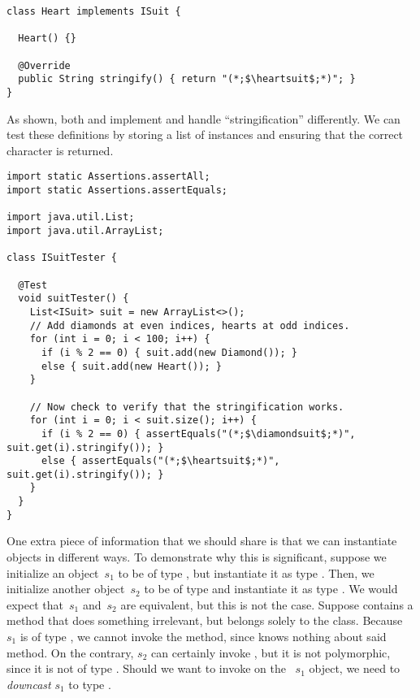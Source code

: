 \begin{lstlisting}[language=MyJava]
class Heart implements ISuit {
    
  Heart() {}

  @Override
  public String stringify() { return "(*;$\heartsuit$;*)"; }
}
\end{lstlisting}

As shown, both  and  implement  and handle ``stringification'' differently. We can test these definitions by storing a list of  instances and ensuring that the correct character is returned.

\begin{lstlisting}[language=MyJava]
import static Assertions.assertAll;
import static Assertions.assertEquals;

import java.util.List;
import java.util.ArrayList;

class ISuitTester {

  @Test
  void suitTester() {
    List<ISuit> suit = new ArrayList<>();
    // Add diamonds at even indices, hearts at odd indices.
    for (int i = 0; i < 100; i++) {
      if (i % 2 == 0) { suit.add(new Diamond()); }
      else { suit.add(new Heart()); }
    }

    // Now check to verify that the stringification works.
    for (int i = 0; i < suit.size(); i++) {
      if (i % 2 == 0) { assertEquals("(*;$\diamondsuit$;*)", suit.get(i).stringify()); }
      else { assertEquals("(*;$\heartsuit$;*)", suit.get(i).stringify()); }
    }
  }
}
\end{lstlisting}

One extra piece of information that we should share is that we can instantiate objects in different ways. 
To demonstrate why this is significant, suppose we initialize an object~$s_1$ to be of type , but instantiate it as type . 
Then, we initialize another object~$s_2$ to be of type  and instantiate it as type . 
We would expect that~$s_1$ and~$s_2$ are equivalent, but this is not the case. 
Suppose  contains a method  that does something irrelevant, but belongs solely to the  class. 
Because~$s_1$ is of type , we cannot invoke the  method, since  knows nothing about said method. 
On the contrary, $s_2$ can certainly invoke , but it is not polymorphic, since it is not of type . 
Should we want to invoke  on the ~$s_1$ object, we need to \emph{downcast} $s_1$ to type .

